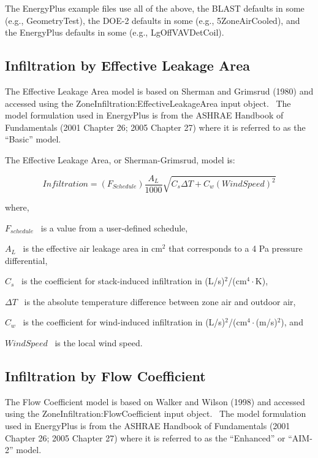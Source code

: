 The EnergyPlus example files use all of the above, the BLAST defaults in some (e.g., GeometryTest), the DOE-2 defaults in some (e.g., 5ZoneAirCooled), and the EnergyPlus defaults in some (e.g., LgOffVAVDetCoil).

\subsection{Infiltration by Effective Leakage Area}\label{infiltration-by-effective-leakage-area}

The Effective Leakage Area model is based on Sherman and Grimsrud (1980) and accessed using the ZoneInfiltration:EffectiveLeakageArea input object.~ The model formulation used in EnergyPlus is from the ASHRAE Handbook of Fundamentals (2001 Chapter 26; 2005 Chapter 27) where it is referred to as the ``Basic'' model.

The Effective Leakage Area, or Sherman-Grimsrud, model is:

\begin{equation}
Infiltration = \left( {{F_{Schedule}}} \right)\frac{{{A_L}}}{{1000}}\sqrt {{C_s}\Delta T + {C_w}{{\left( {WindSpeed} \right)}^2}}
\end{equation}

where,

\({F_{schedule}}\) ~is a value from a user-defined schedule,

\({A_L}\) ~is the effective air leakage area in cm\(^{2}\) that corresponds to a 4 Pa pressure differential,

\({C_s}\) ~is the coefficient for stack-induced infiltration in (L/s)\(^{2}\)/(cm\(^{4}\cdot\)K),

\(\Delta T\) ~is the absolute temperature difference between zone air and outdoor air,

\({C_w}\) ~is the coefficient for wind-induced infiltration in (L/s)\(^{2}\)/(cm\(^{4}\cdot\)(m/s)\(^{2}\)), and

\(WindSpeed\) ~is the local wind speed.

\subsection{Infiltration by Flow Coefficient}\label{infiltration-by-flow-coefficient}

The Flow Coefficient model is based on Walker and Wilson (1998) and accessed using the ZoneInfiltration:FlowCoefficient input object.~ The model formulation used in EnergyPlus is from the ASHRAE Handbook of Fundamentals (2001 Chapter 26; 2005 Chapter 27) where it is referred to as the ``Enhanced'' or ``AIM-2'' model.

